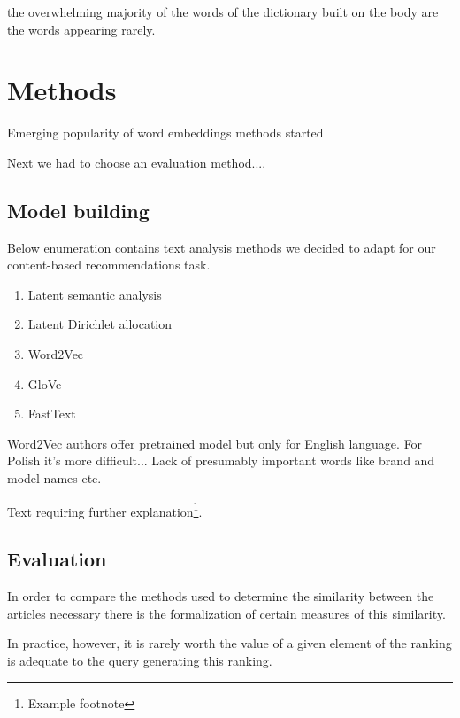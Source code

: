 \documentclass[twoside,twocolumn]{article}
\begin{document}
	the overwhelming majority of the words of the dictionary built on the body are the words appearing
	rarely.
	\section{Methods}

	Emerging popularity of word embeddings methods started 
	
	Next we had to choose an evaluation method....

	\subsection{Model building}
	
	Below enumeration contains text analysis methods we decided to adapt for our content-based recommendations task.
	
	\begin{enumerate}
		\item Latent semantic analysis
		\item Latent Dirichlet allocation
		\item Word2Vec %
		\item GloVe
		\item FastText
	\end{enumerate}
	
	Word2Vec authors offer pretrained model but only for English language. For Polish it's more difficult...
	Lack of presumably important words like brand and model names etc.  
	
	
	
	
	Text requiring further explanation\footnote{Example footnote}.
	
	\subsection{Evaluation}
	
	In order to compare the methods used to determine the similarity between the articles necessary
	there is the formalization of certain measures of this similarity.
	
	
	In practice, however, it is rarely worth the value of a given element of the ranking
	is adequate to the query generating this ranking.
	
\end{document}
